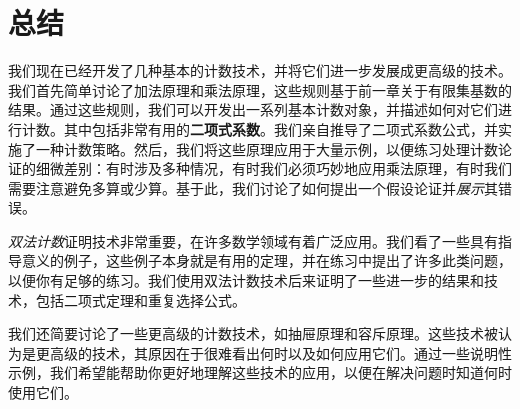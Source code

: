 \section{总结}

我们现在已经开发了几种基本的计数技术，并将它们进一步发展成更高级的技术。我们首先简单讨论了加法原理和乘法原理，这些规则基于前一章关于有限集基数的结果。通过这些规则，我们可以开发出一系列基本计数对象，并描述如何对它们进行计数。其中包括非常有用的\textbf{二项式系数}。我们亲自推导了二项式系数公式，并实施了一种计数策略。然后，我们将这些原理应用于大量示例，以便练习处理计数论证的细微差别：有时涉及多种情况，有时我们必须巧妙地应用乘法原理，有时我们需要注意避免多算或少算。基于此，我们讨论了如何提出一个假设论证并\emph{展示}其错误。

\emph{双法计数}证明技术非常重要，在许多数学领域有着广泛应用。我们看了一些具有指导意义的例子，这些例子本身就是有用的定理，并在练习中提出了许多此类问题，以便你有足够的练习。我们使用双法计数技术后来证明了一些进一步的结果和技术，包括二项式定理和重复选择公式。

我们还简要讨论了一些更高级的计数技术，如抽屉原理和容斥原理。这些技术被认为是更高级的技术，其原因在于很难看出何时以及如何应用它们。通过一些说明性示例，我们希望能帮助你更好地理解这些技术的应用，以便在解决问题时知道何时使用它们。